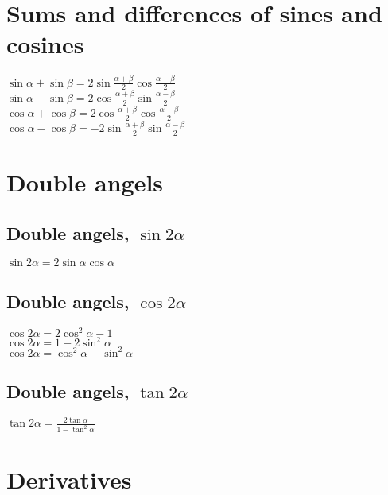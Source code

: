 \documentclass[a4paper, 10pt]{scrartcl}
\begin{document}
\section*{Sums and differences of sines and cosines}
$\sin{\alpha} + \sin{\beta} = 2\sin{\frac{\alpha + \beta}{2}}\cos{\frac{\alpha - \beta}{2}}$\\
$\sin{\alpha} - \sin{\beta} = 2\cos{\frac{\alpha + \beta}{2}}\sin{\frac{\alpha - \beta}{2}}$\\
$\cos{\alpha} + \cos{\beta} = 2\cos{\frac{\alpha + \beta}{2}}\cos{\frac{\alpha - \beta}{2}}$\\
$\cos{\alpha} - \cos{\beta} = -2\sin{\frac{\alpha + \beta}{2}}\sin{\frac{\alpha - \beta}{2}}$\\

\section*{Double angels}

\subsection*{Double angels, $\sin{2\alpha}$}
$\sin{2\alpha} = 2\sin{\alpha}\cos{\alpha}$\\

\subsection*{Double angels, $\cos{2\alpha}$}
$\cos{2\alpha} = 2\cos^{2}{\alpha} - 1$\\
$\cos{2\alpha} = 1 - 2\sin^{2}{\alpha}$\\
$\cos{2\alpha} = \cos^{2}{\alpha} - \sin^{2}{\alpha}$\\

\subsection*{Double angels, $\tan{2\alpha}$}
$\tan{2\alpha} = \frac{2\tan{\alpha}}{1 - \tan^{2}{\alpha}}$\\

\section*{Derivatives}
\end{document}
